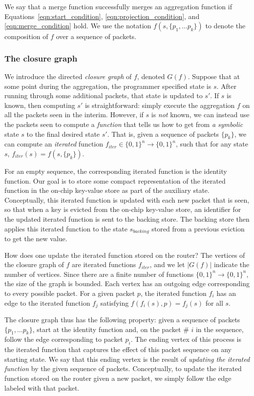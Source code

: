 We say that a merge function successfully merges an aggregation function if
Equations~\ref{eqn:start_condition}, \ref{eqn:projection_condition}, and
\ref{eqn:merge_condition} hold. We use the notation $f(s, \{p_1, \ldots p_k\})$
to denote the composition of $f$ over a sequence of packets. 

\subsubsection{The closure graph}
\label{ss:closure}

We introduce the directed \emph{closure graph} of $f$, denoted $G(f)$. Suppose
that at some point during the aggregation, the programmer specified state is
$s$. After running through some additional packets, that state is updated to
$s'$. If $s$ is known, then computing $s'$ is straightforward: simply execute
the aggregation $f$ on all the packets seen in the interim. However, if $s$ is
\emph{not} known, we can instead use the packets seen to compute a {\em function}
that tells us how to get from \emph{a symbolic} state $s$ to the final desired
state $s'$. That is, given a sequence of packets $\{p_k\}$, we can compute an
\emph{iterated} function $f_{iter} \in \{0,1\}^n \rightarrow \{0,1\}^n$, such that
for any state $s$, $f_{iter}(s) = f(s, \{p_k\})$.

For an empty sequence, the corresponding iterated function is the identity
function.  Our goal is to store some compact representation of the iterated
function in the on-chip key-value store as part of the auxiliary state.
Conceptually, this iterated function is updated with each new packet that is
seen, so that when a key is evicted from the on-chip key-value store, an
identifier for the updated iterated function is sent to the backing store.  The
backing store then applies this iterated function to the state $s_{backing}$
stored from a previous eviction to get the new value.

How does one update the iterated function stored on the router? The vertices of
the closure graph of $f$ are iterated functions $f_{iter}$, and we let $|G(f)|$
indicate the number of vertices. Since there are a finite number of functions
$\{0, 1\}^n \rightarrow \{0, 1\}^n$, the size of the graph is bounded.  Each
vertex has an outgoing edge corresponding to every possible packet. For a given
packet $p$, the iterated function $f_i$ has an edge to the iterated function $f_j$
satisfying $f(f_i(s), p) = f_j(s)$ for all $s$.

The closure graph thus has the following property: given a sequence of packets
$\{p_1, \ldots p_k\}$, start at the identity function and, on the packet \# $i$
in the sequence, follow the edge corresponding to packet $p_i$. The ending
vertex of this process is the iterated function that captures the effect of
this packet sequence on any starting state. We say that this ending vertex is
the result of \emph{updating the iterated function} by the given sequence of
packets. Conceptually, to update the iterated function stored on the router
given a new packet, we simply follow the edge labeled with that packet.

